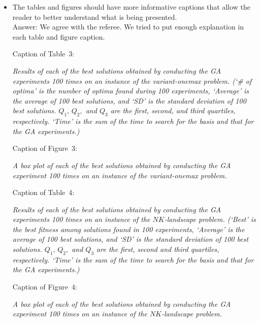 \documentclass[a4paper]{article}
\newenvironment*{qna}{%
	\newcommand{\comment}{\item \sf}%
	\newcommand{\answer}{\medskip\\Answer: \rm}%
	\newcommand*{\quotehead}{\medskip\par\rm}%
	\newcommand*{\quotetail}{\par\it}%
	\newcommand{\quoteit}{\medskip\par\it}%
	\begin{itemize}%
	}{%
	\end{itemize}\normalfont%
}
\begin{document}
\begin{qna}
\comment
	The tables and figures should have more informative captions that allow the
	reader to better understand what is being presented.
\answer
	We agree with the referee. We tried to put enough explanation in each table and figure caption.	

\quotehead
	Caption of Table~3:
\quotetail
	Results of each of the best solutions obtained by conducting the GA experiments 100 times on an instance of the variant-onemax problem. (`\# of optima' is the number of optima found during 100 experiments, `Average' is the average of 100 best solutions, and `SD' is the standard deviation of 100 best solutions. $ Q_1, \, Q_2, $ and $ Q_3 $ are the first, second, and third quartiles, respectively. `Time' is the sum of the time to search for the basis and that for the GA experiments.)

\quotehead
	Caption of Figure~3: \par
\quotetail
	A box plot of each of the best solutions obtained by conducting the GA experiment 100 times on an instance of the variant-onemax problem.

\quotehead
	Caption of Table~4: \par
\quotetail
	Results of each of the best solutions obtained by conducting the GA experiments 100 times on an instance of the $ NK $-landscape problem. (`Best' is the best fitness among solutions found in 100 experiments, `Average' is the average of 100 best solutions, and `SD' is the standard deviation of 100 best solutions. $ Q_1, \, Q_2, $ and $ Q_3 $ are the first, second and third quartiles, respectively. `Time' is the sum of the time to search for the basis and that for the GA experiments.)

\quotehead
	Caption of Figure~4:
\quotetail
	A box plot of each of the best solutions obtained by conducting the GA experiment 100 times on an instance of the $ NK $-landscape problem.
\end{qna}
\end{document}
